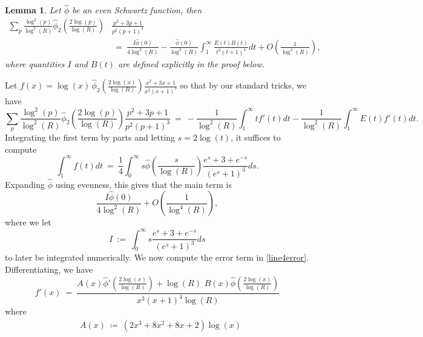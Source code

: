 \documentclass[11pt, reqno]{amsart}
\makeatletter
\renewenvironment{proof}[1][\proofname]{\par
  \vspace{-.7\topsep}%
  \pushQED{\qed}%
  \normalfont
  \topsep0pt \partopsep0pt %
  \trivlist
  \item[\hskip\labelsep
        \itshape
    #1\@addpunct{.}]\ignorespaces
}{%
  \popQED\endtrivlist\@endpefalse
  \addvspace{6pt plus 6pt} %
}
\newtheorem{lemma}[theorem]{Lemma}
\theoremstyle{definition}
\theoremstyle{remark}
\numberwithin{equation}{section}
\renewcommand{\hat}{\widehat}
\makeatother
\begin{document}
\begin{lemma}\label{line4}
    Let $\hat\phi$ be an even Schwartz function, then
    \[
        \begin{aligned}
        \sum_p \frac{\log^2(p)}{\log^2(R)}\hat\phi_2\left(\frac{2\log(p)}{\log(R)}\right) &\frac{p^2+3p+1}{p^2(p+1)^3}\\
        & \ = \ \frac{I\hat\phi(0)}{4\log^2(R)}-\frac{\hat\phi(0)}{\log^2(R)}\int_1^\infty \frac{E(t)B(t)}{t^3(t+1)^4}dt+O\left(\frac{1}{\log^4(R)}\right),
        \end{aligned}
    \]
    where quantities $I$ and $B(t)$ are defined explicitly in the proof below.
\end{lemma}
\begin{proof}
    Let $f(x)=\log(x)\,\hat\phi_2\left(\frac{2\log(x)}{\log(R)}\right) \frac{x^2+3x+1}{x^2(x+1)^3}$ so that by our standard tricks, we have
    \begin{equation}\label{line4error}
        \sum_p \frac{\log^2(p)}{\log^2(R)}\hat\phi_2\left(\frac{2\log(p)}{\log(R)}\right) \frac{p^2+3p+1}{p^2(p+1)^3}\ = \ -\frac{1}{\log^2(R)}\int_1^\infty tf'(t)dt-\frac{1}{\log^2(R)}\int_1^\infty E(t)f'(t)dt.
    \end{equation}
    Integrating the first term by parts and letting $s=2\log(t)$, it suffices to compute
    \begin{equation}
    \int_1^\infty f(t)dt \ = \ \frac{1}{4}\int_0^\infty s \hat\phi\left(\frac{s}{\log(R)}\right) \frac{e^s+3+e^{-s}}{(e^s+1)^3}ds.
    \end{equation}
    Expanding $\hat\phi$ using evenness, this gives that the main term is
    \begin{equation}
    \frac{I\hat\phi(0)}{4\log^2(R)}+O\left(\frac{1}{\log^4(R)}\right),
    \end{equation}
where we let 
    \begin{equation}
        I \ := \ \int_0^\infty s\frac{e^s+3+e^{-s}}{(e^s+1)^3}ds
    \end{equation}
to later be integrated numerically. %
We now compute the error term in \eqref{line4error}. Differentiating, we have
    \begin{equation}
        f'(x) \ = \ \frac{A(x)\hat\phi'\left(\frac{2\log(x)}{\log(R)}\right)+\log(R)\,\,B(x)\hat\phi\left(\frac{2\log(x)}{\log(R)}\right)}{x^3(x+1)^4\log(R)}
    \end{equation}
    where 
    \begin{align}
        &A(x)\ \coloneq \ (2x^3+8x^2+8x+2)\log(x)\\

\end{align}
\end{proof}
\end{document}
